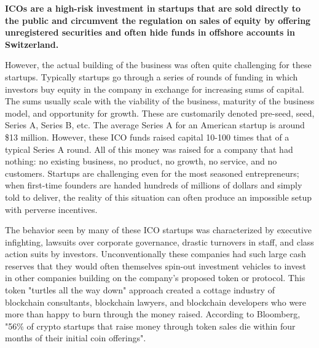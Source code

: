 
\begin{infobox}
 \textbf{
    ICOs are a high-risk investment in startups that are sold directly to the
    public and circumvent the regulation on sales of equity by offering
    unregistered securities and often hide funds in offshore accounts in
    Switzerland.
  }
\end{infobox}

However, the actual building of the business was often quite challenging for
these startups. Typically startups go through a series of rounds of funding in
which investors buy equity in the company in exchange for increasing sums of
capital. The sums usually scale with the viability of the business, maturity of
the business model, and opportunity for growth. These are customarily denoted
pre-seed, seed, Series A, Series B, etc. The average Series A for an American
startup is around \$13 million. However, these ICO funds raised capital 10-100
times that of a typical Series A round. All of this money was raised for a
company that had nothing: no existing business, no product, no growth, no
service, and no customers. Startups are challenging even for the most seasoned
entrepreneurs; when first-time founders are handed hundreds of millions of
dollars and simply told to deliver, the reality of this situation can often
produce an impossible setup with perverse incentives. \cite{howell_initial_2018}

The behavior seen by many of these ICO startups was characterized by executive
infighting, lawsuits over corporate governance, drastic turnovers in staff, and
class action suits by investors. Unconventionally these companies had such large
cash reserves that they would often themselves spin-out investment vehicles to
invest in other companies building on the company's proposed token or protocol.
This token "turtles all the way down" approach created a cottage industry of
blockchain consultants, blockchain lawyers, and blockchain developers who were
more than happy to burn through the money raised. According to Bloomberg, "56\%
of crypto startups that raise money through token sales die within four months
of their initial coin offerings". \cite{kharif_half_2018}

